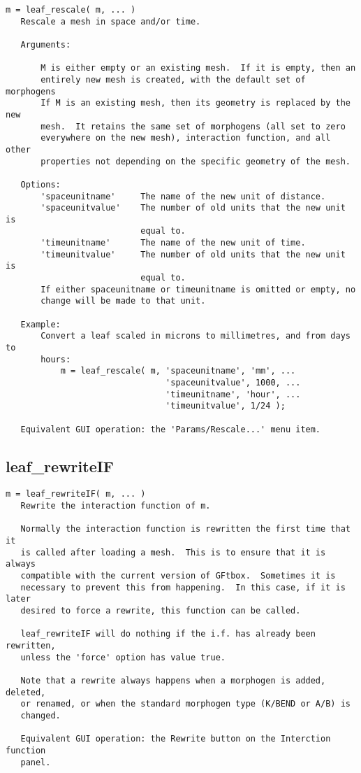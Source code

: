 \begin{verbatim}
m = leaf_rescale( m, ... )
   Rescale a mesh in space and/or time.

   Arguments:
   
       M is either empty or an existing mesh.  If it is empty, then an
       entirely new mesh is created, with the default set of morphogens
       If M is an existing mesh, then its geometry is replaced by the new
       mesh.  It retains the same set of morphogens (all set to zero
       everywhere on the new mesh), interaction function, and all other
       properties not depending on the specific geometry of the mesh.

   Options:
       'spaceunitname'     The name of the new unit of distance.
       'spaceunitvalue'    The number of old units that the new unit is
                           equal to.
       'timeunitname'      The name of the new unit of time.
       'timeunitvalue'     The number of old units that the new unit is
                           equal to.
       If either spaceunitname or timeunitname is omitted or empty, no
       change will be made to that unit.

   Example:
       Convert a leaf scaled in microns to millimetres, and from days to
       hours:
           m = leaf_rescale( m, 'spaceunitname', 'mm', ...
                                'spaceunitvalue', 1000, ...
                                'timeunitname', 'hour', ...
                                'timeunitvalue', 1/24 );

   Equivalent GUI operation: the 'Params/Rescale...' menu item.
\end{verbatim}

\subsection{leaf\_rewriteIF}\label{section-leaf-rewriteIF}

\begin{verbatim}
m = leaf_rewriteIF( m, ... )
   Rewrite the interaction function of m.

   Normally the interaction function is rewritten the first time that it
   is called after loading a mesh.  This is to ensure that it is always
   compatible with the current version of GFtbox.  Sometimes it is
   necessary to prevent this from happening.  In this case, if it is later
   desired to force a rewrite, this function can be called.

   leaf_rewriteIF will do nothing if the i.f. has already been rewritten,
   unless the 'force' option has value true.

   Note that a rewrite always happens when a morphogen is added, deleted,
   or renamed, or when the standard morphogen type (K/BEND or A/B) is
   changed.

   Equivalent GUI operation: the Rewrite button on the Interction function
   panel.
\end{verbatim}

